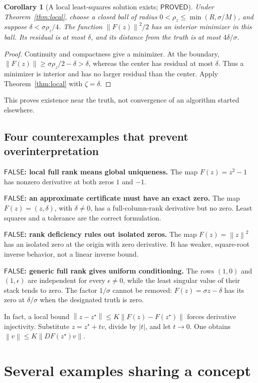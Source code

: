 \documentclass[12pt,a4paper]{article}
\theoremstyle{readable}
\newtheorem{corollary}[theorem]{Corollary}
\theoremstyle{definition}\newtheorem{example}[theorem]{Example}
\newcommand{\norm}[1]{\left\|#1\right\|}
\newcommand{\PP}{\mathsf{PROVED}}\newcommand{\FF}{\mathsf{FALSE}}
\begin{document}
\begin{corollary}[A local least-squares solution exists; \(\PP\)]\label{cor:exist}
Under Theorem~\ref{thm:local}, choose a closed ball of radius \(0<\rho_z\le\min(R,\sigma/M)\), and suppose \(\delta<\sigma\rho_z/4\). The function \(\norm{F(z)}^2/2\) has an interior minimizer in this ball. Its residual is at most \(\delta\), and its distance from the truth is at most \(4\delta/\sigma\).
\end{corollary}
\begin{proof}
Continuity and compactness give a minimizer. At the boundary,
\(\norm{F(z)}\ge\sigma\rho_z/2-\delta>\delta\), whereas the center has residual at most \(\delta\). Thus a minimizer is interior and has no larger residual than the center. Apply Theorem~\ref{thm:local} with \(\zeta=\delta\).
\end{proof}
This proves existence near the truth, not convergence of an algorithm started elsewhere.

\subsection{Four counterexamples that prevent overinterpretation}
\textbf{\(\FF\): local full rank means global uniqueness.} The map \(F(z)=z^2-1\) has nonzero derivative at both zeros \(1\) and \(-1\).

\textbf{\(\FF\): an approximate certificate must have an exact zero.} The map \(F(z)=(z,\delta)\), with \(\delta\ne0\), has a full-column-rank derivative but no zero. Least squares and a tolerance are the correct formulation.

\textbf{\(\FF\): rank deficiency rules out isolated zeros.} The map \(F(z)=\norm z^2\) has an isolated zero at the origin with zero derivative. It has weaker, square-root inverse behavior, not a linear inverse bound.

\textbf{\(\FF\): generic full rank gives uniform conditioning.} The rows \((1,0)\) and \((1,\epsilon)\) are independent for every \(\epsilon\ne0\), while the least singular value of their stack tends to zero. The factor \(1/\sigma\) cannot be removed: \(F(z)=\sigma z-\delta\) has its zero at \(\delta/\sigma\) when the designated truth is zero.

In fact, a local bound \(\norm{z-z^\star}\le K\norm{F(z)-F(z^\star)}\) forces derivative injectivity. Substitute \(z=z^\star+tv\), divide by \(|t|\), and let \(t\to0\). One obtains \(\norm v\le K\norm{DF(z^\star)v}\).

\section{Several examples sharing a concept}
\label{sec:shared}
\end{document}
